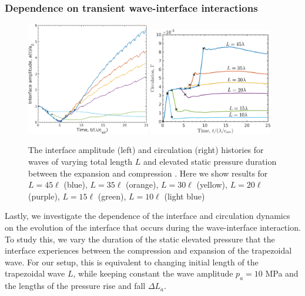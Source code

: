 \documentclass{jfm}%
\begin{document}
\subsubsection{Dependence on transient wave-interface interactions}%
\begin{figure}
  \centering
  \includegraphics[width=0.48\textwidth]{./figs/lung_figs/interface_multi-lag}
  \includegraphics[width=0.48\textwidth]{./figs/lung_figs/circulation_multi-lag_fixed}
  \caption[The interface and circulation dependence on wave
  duration]{The interface amplitude (left) and circulation (right)
    histories for waves of varying total length $L$ and elevated
    static pressure duration between the expansion and compression
    . Here we show results for $L=45\ell$ (blue), $L=35\ell$ (orange),
    $L=30\ell$ (yellow), $L=20\ell$ (purple), $L=15\ell$ (green),
    $L=10\ell$ (light blue)}
  \label{fig:trapz_circ_interface_multi-lag}
\end{figure}
Lastly, we investigate the dependence of the interface and circulation
dynamics on the evolution of the interface that occurs during the
wave-interface interaction. To study this, we vary the duration of the
static elevated pressure that the interface experiences between the
compression and expansion of the trapezoidal wave. For our setup, this
is equivalent to changing initial length of the trapezoidal wave $L$,
while keeping constant the wave amplitude $p_a=10$ MPa and the lengths
of the pressure rise and fall $\Delta L_a$. 
\end{document}
